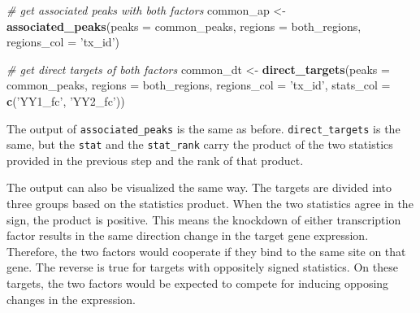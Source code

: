 \documentclass[9pt,a4paper,]{extarticle}
\newenvironment{Shaded}{\begin{snugshade}}{\end{snugshade}}
\newcommand{\CommentTok}[1]{\textcolor[rgb]{0.56,0.35,0.01}{\textit{#1}}}
\newcommand{\DataTypeTok}[1]{\textcolor[rgb]{0.13,0.29,0.53}{#1}}
\newcommand{\KeywordTok}[1]{\textcolor[rgb]{0.13,0.29,0.53}{\textbf{#1}}}
\newcommand{\NormalTok}[1]{#1}
\newcommand{\StringTok}[1]{\textcolor[rgb]{0.31,0.60,0.02}{#1}}
\begin{document}
\begin{Shaded}
\begin{Highlighting}[]
\CommentTok{# get associated peaks with both factors}
\NormalTok{common_ap <-}\StringTok{ }\KeywordTok{associated_peaks}\NormalTok{(}\DataTypeTok{peaks =}\NormalTok{ common_peaks,}
                              \DataTypeTok{regions =}\NormalTok{ both_regions,}
                              \DataTypeTok{regions_col =} \StringTok{'tx_id'}\NormalTok{)}

\CommentTok{# get direct targets of both factors}
\NormalTok{common_dt <-}\StringTok{ }\KeywordTok{direct_targets}\NormalTok{(}\DataTypeTok{peaks =}\NormalTok{ common_peaks,}
                            \DataTypeTok{regions =}\NormalTok{ both_regions,}
                            \DataTypeTok{regions_col =} \StringTok{'tx_id'}\NormalTok{,}
                            \DataTypeTok{stats_col =} \KeywordTok{c}\NormalTok{(}\StringTok{'YY1_fc'}\NormalTok{, }\StringTok{'YY2_fc'}\NormalTok{))}
\end{Highlighting}
\end{Shaded}

The output of \texttt{associated\_peaks} is the same as before. \texttt{direct\_targets} is the same, but the \texttt{stat} and the \texttt{stat\_rank} carry the product of the two statistics provided in the previous step and the rank of that product.

The output can also be visualized the same way. The targets are divided into three groups based on the statistics product. When the two statistics agree in the sign, the product is positive. This means the knockdown of either transcription factor results in the same direction change in the target gene expression. Therefore, the two factors would cooperate if they bind to the same site on that gene. The reverse is true for targets with oppositely signed statistics. On these targets, the two factors would be expected to compete for inducing opposing changes in the expression.
\end{document}
